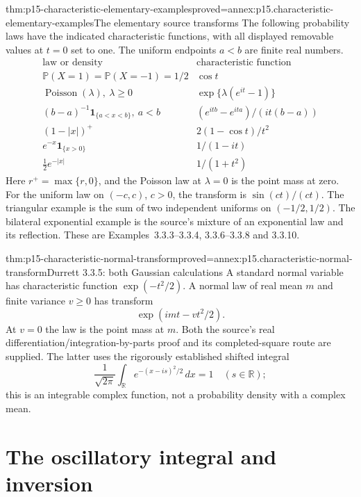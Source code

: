 \begin{hbtheorem}{thm:p15-characteristic-elementary-examples}{proved=annex:p15.characteristic-elementary-examples}{The elementary source transforms}
The following probability laws have the indicated characteristic
functions, with all displayed removable values at \(t=0\) set to one.
The uniform endpoints \(a<b\) are finite real numbers.
\[
 \begin{array}{c|c}
 \text{law or density}&\text{characteristic function}\\ \hline
 \mathbb P(X=1)=\mathbb P(X=-1)=1/2 & \cos t\\
 \operatorname{Poisson}(\lambda),\ \lambda\geq0
                    & \exp\{\lambda(e^{it}-1)\}\\
 (b-a)^{-1}\mathbf1_{\{a<x<b\}},\ a<b
                    &(e^{itb}-e^{ita})/(it(b-a))\\
 (1-|x|)^+          &2(1-\cos t)/t^2\\
 e^{-x}\mathbf1_{\{x>0\}}&1/(1-it)\\
 \tfrac12e^{-|x|}   &1/(1+t^2)
 \end{array}
\]
Here \(r^+=\max\{r,0\}\), and the Poisson law at \(\lambda=0\)
is the point mass at zero.
For the uniform law on \((-c,c)\), \(c>0\), the transform is
\(\sin(ct)/(ct)\).
The triangular example is the sum of two independent uniforms
on \((-1/2,1/2)\). The bilateral exponential example is the
source's mixture of an exponential law and its reflection.
These are Examples~3.3.3--3.3.4, 3.3.6--3.3.8 and 3.3.10.
\end{hbtheorem}

\begin{hbtheorem}{thm:p15-characteristic-normal-transform}{proved=annex:p15.characteristic-normal-transform}{Durrett 3.3.5: both Gaussian calculations}
A standard normal variable has characteristic function
\(\exp(-t^2/2)\). A normal law of real mean \(m\) and finite variance
\(v\geq0\) has transform
\[
 \exp(imt-vt^2/2).
\]
At \(v=0\) the law is the point mass at \(m\).
Both the source's real differentiation/integration-by-parts
proof and its completed-square route are supplied. The latter
uses the rigorously established shifted integral
\[
 \frac1{\sqrt{2\pi}}\int_{\mathbb R}e^{-(x-is)^2/2}\,dx=1
                                      \quad(s\in\mathbb R);
\]
this is an integrable complex function, not a probability
density with a complex mean.
\end{hbtheorem}

\section{The oscillatory integral and inversion}
\label{sec:p15-characteristic-inversion}

